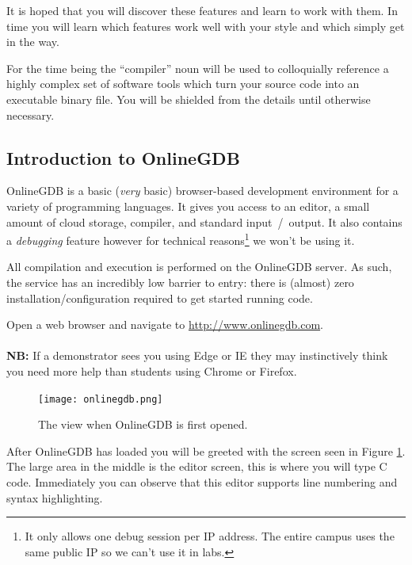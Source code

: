\documentclass{lab}
\begin{document}
It is hoped that you will discover these features and learn to work with them. In time you will learn which features work well with your style and which simply get in the way.

For the time being the ``compiler'' noun will be used to colloquially reference a highly complex set of software tools which turn your source code into an executable binary file. You will be shielded from the details until otherwise necessary.

\subsection{Introduction to OnlineGDB}

OnlineGDB is a basic (\textit{very} basic) browser-based development environment for a variety of programming languages. It gives you access to an editor, a small amount of cloud storage, compiler, and standard input~/~output. It also contains a \textit{debugging} feature however for technical reasons\footnote{It only allows one debug session per IP address. The entire campus uses the same public IP so we can't use it in labs.} we won't be using it.

All compilation and execution is performed on the OnlineGDB server. As such, the service has an incredibly low barrier to entry: there is (almost) zero installation/configuration required to get started running code.

\begin{task}{}{}
Open a web browser and navigate to \url{http://www.onlinegdb.com}.\\ \\ \textbf{NB:} If a demonstrator sees you using Edge or IE they may instinctively think you need more help than students using Chrome or Firefox.
\end{task}

\begin{figure}[H]
\begin{center}
\texttt{[image: onlinegdb.png]}
\end{center}
\caption{The view when OnlineGDB is first opened.}\label{fig:onlinegdb}
\end{figure}

After OnlineGDB has loaded you will be greeted with the screen seen in Figure \ref{fig:onlinegdb}. The large area in the middle is the editor screen, this is where you will type C code. Immediately you can observe that this editor supports line numbering and syntax highlighting.
\end{document}
